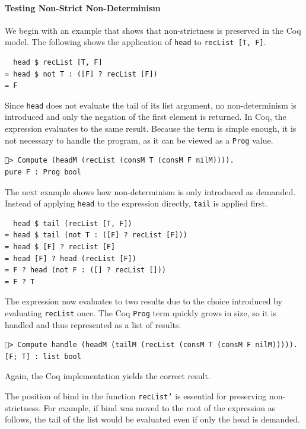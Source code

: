 \documentclass[a4paper, 11pt, fleqn, twoside, abstract=on]{scrreprt}
\newcommand{\hinl}[1]{\texttt{#1}}
\newcommand{\cinl}[1]{\texttt{#1}}
\begin{document}
\paragraph{Testing Non-Strict Non-Determinism}
We begin with an example that shows that non-strictness is preserved in the Coq model.
The following shows the application of \cinl{head} to \cinl{recList [T, F]}.

\begin{verbatim}
  head $ recList [T, F]
= head $ not T : ([F] ? recList [F])
= F
\end{verbatim}

Since \hinl{head} does not evaluate the tail of its list argument, no non-determinism is introduced and only the negation of the first element is returned.
In Coq, the expression evaluates to the same result.
Because the term is simple enough, it is not necessary to handle the program, as it can be viewed as a \cinl{Prog} value.

\begin{verbatim}
🐔> Compute (headM (recList (consM T (consM F nilM)))).
pure F : Prog bool
\end{verbatim}

The next example shows how non-determinism is only introduced as demanded.
Instead of applying \hinl{head} to the expression directly, \hinl{tail} is applied first.

\begin{verbatim}
  head $ tail (recList [T, F])
= head $ tail (not T : ([F] ? recList [F]))
= head $ [F] ? recList [F]
= head [F] ? head (recList [F])
= F ? head (not F : ([] ? recList []))
= F ? T
\end{verbatim}

The expression now evaluates to two results due to the choice introduced by evaluating \hinl{recList} once.
The Coq \cinl{Prog} term quickly grows in size, so it is handled and thus represented as a list of results.

\begin{verbatim}
🐔> Compute handle (headM (tailM (recList (consM T (consM F nilM))))).
[F; T] : list bool
\end{verbatim}
\noindent
Again, the Coq implementation yields the correct result.

The position of bind in the function \cinl{recList'} is essential for preserving non-strictness.
For example, if bind was moved to the root of the expression as follows, the tail of the list would be evaluated even if only the head is demanded.
\end{document}
